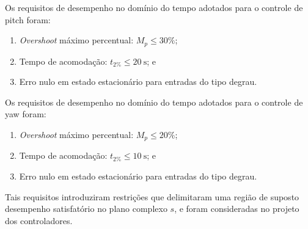 Os requisitos de desempenho no domínio do tempo adotados para o controle de pitch foram:

\begin{enumerate}
    \item \textit{Overshoot} máximo percentual: $M_{p} \leq 30\%$;
    \item Tempo de acomodação: $t_{2\%} \leq \SI{20}{\s}$; e
    \item Erro nulo em estado estacionário para entradas do tipo degrau.
\end{enumerate}

Os requisitos de desempenho no domínio do tempo adotados para o controle de yaw foram:

\begin{enumerate}
    \item \textit{Overshoot} máximo percentual: $M_{p} \leq 20\%$;
    \item Tempo de acomodação: $t_{2\%} \leq \SI{10}{\s}$; e
    \item Erro nulo em estado estacionário para entradas do tipo degrau.
\end{enumerate}


Tais requisitos introduziram restrições que delimitaram uma região de suposto desempenho satisfatório no plano complexo $s$, e foram consideradas no projeto dos controladores.
